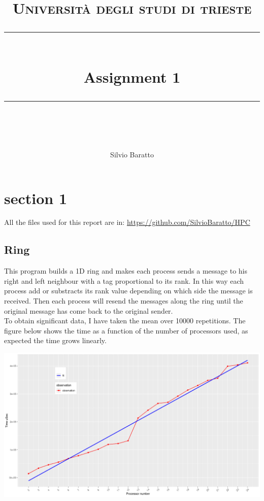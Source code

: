 \documentclass[11pt,a4paper]{report}
\theoremstyle{definition}
\begin{document}
\newcommand{\horrule}[1]{\rule{\linewidth}{#1}}
\lstset{language=Java} 
\lstset{basicstyle=\footnotesize\ttfamily}
\author{Silvio Baratto}
\title{
\normalfont \normalsize 
\textsc{Università degli studi di trieste} \\ [25pt] %
\horrule{0.5pt} \\[0.4cm] %
\huge Assignment 1\\ %
\horrule{2pt} \\[0.5cm] %
}
\maketitle
\tableofcontents
\chapter{section 1}
All the files used for this report are in: \href{https://github.com/SilvioBaratto/HPC}{https://github.com/SilvioBaratto/HPC}
\section{Ring}
This program builds a 1D ring and makes each process sends a message to his right and left neighbour with a tag proportional to its rank. In this way each process add or substracts its rank value depending on which side the message is received. Then each process will resend the messages along the ring until the original message has come back to the original sender. \\
To obtain significant data, I have taken the mean over 10000 repetitions. The figure below shows the time as a function of the number of processors used, as expected the time grows linearly.
\begin{center}
\includegraphics[scale=.45]{ring}
\end{center}
\end{document}
